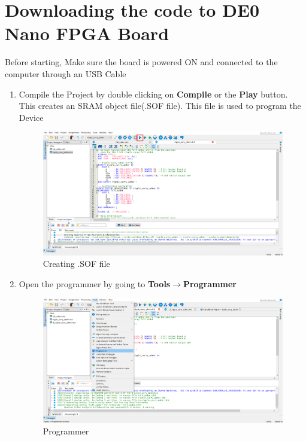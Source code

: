 \documentclass[12pt,singleside,a4paper]{article}
\begin{document}
 \section{Downloading the code to DE0 Nano FPGA Board}
 Before starting, Make sure the board is powered ON and connected to the computer through an USB Cable
 
 \begin{enumerate}
     \item Compile the Project by double clicking on \textbf{Compile} or the \textbf{Play} button. This creates an SRAM object file(.SOF file). This file is used to program the Device
     \begin{figure}[H]
         \centering
         \includegraphics[width=14cm,keepaspectratio]{img16.png}
     \caption{Creating .SOF file}
     \end{figure}
     
     \item Open the programmer by going to \textbf{Tools}$\rightarrow$\textbf{Programmer}
     \begin{figure}[H]
         \centering
         \includegraphics[width=14cm,keepaspectratio]{img17.png}
     \caption{Programmer}
     \end{figure}
     \newpage
     

\end{enumerate}
\end{document}
